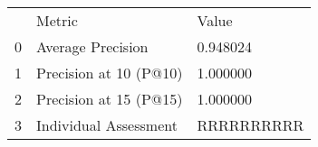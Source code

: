 \begin{tabular}{lll}
 & Metric & Value \\
0 & Average Precision & 0.948024 \\
1 & Precision at 10 (P@10) & 1.000000 \\
2 & Precision at 15 (P@15) & 1.000000 \\
3 & Individual Assessment & RRRRRRRRRR \\
\end{tabular}
